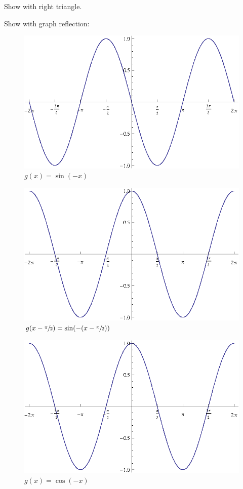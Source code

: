 \documentclass{exam}
\begin{document}
  Show with right triangle.

  Show with graph reflection:

  \begin{figure}[H]
    \centering
    \includegraphics[scale=0.7]{sine_negative_x}
    \caption{$g(x) = \sin(-x)$}
  \end{figure}

  \begin{figure}[H]
    \centering
    \includegraphics[scale=0.7]{cosine_x}
    \caption{$g(x - \sfrac{\pi}{2}) = \sin(- ( x - \sfrac{\pi}{2}))$}
  \end{figure}

  \begin{figure}[H]
    \centering
    \includegraphics[scale=0.7]{cosine_x}
    \caption{$g(x) = \cos(-x)$}
  \end{figure}
\end{document}
